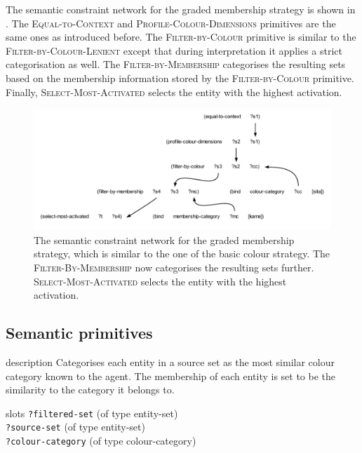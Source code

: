 The semantic constraint network for the graded membership
  strategy is shown in . The
\textsc{Equal-to-Context} and \textsc{Profile-Colour-Dimensions}
primitives are the same ones as introduced before. The
\textsc{Filter-by-Colour} primitive is similar to the
\textsc{Filter-by-Colour-Lenient} except that during interpretation it
applies a strict categorisation as well. The
\textsc{Filter-by-Membership} categorises the resulting sets based on
the membership information stored by the \textsc{Filter-by-Colour}
primitive. Finally, \textsc{Select-Most-Activated} selects the entity
with the highest activation.

\begin{figure}[htbp]
  \centering
  \includegraphics[width=.85\textwidth]{./graded-membership/figures/semantic-program.pdf}
  \caption[The semantic constraint network for the graded membership
  strategy]{The semantic constraint network for the graded membership
    strategy, which is similar to the one of the basic colour
    strategy. The \textsc{Filter-By-Membership} now categorises the
    resulting sets further. \textsc{Select-Most-Activated} selects the
    entity with the highest activation.}
  \label{f:gms-semantic-program}
\end{figure}

\subsection{Semantic primitives}


\begin{explanation}{description}
  Categorises each entity in a source set as the most similar colour
  category known to the agent. The membership of each entity is set to
  be the similarity to the category it belongs to.
\end{explanation}

\begin{explanation}{slots}
  \verb+?filtered-set+ (of type entity-set) \\
  \verb+?source-set+ (of type entity-set) \\
  \verb+?colour-category+ (of type colour-category)
\end{explanation}

